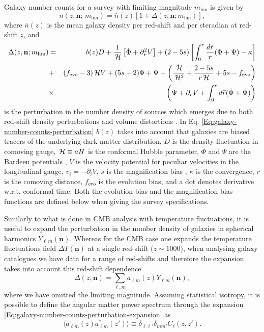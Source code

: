 Galaxy number counts for a survey with limiting magnitude $m_{\mathrm{lim}}$ is given by 
\begin{equation}
\label{Eq:galaxy-number-counts}
n(z,\mathbf{n};\,m_{\mathrm{lim}}) = \bar{n}(z) \left[ 1 + \Delta(z,\mathbf{n};m_{\mathrm{lim}}) \right],
\end{equation}  
where $\bar{n}(z)$ is the mean galaxy density per red-shift and per steradian at red-shift $z$, and 
\begin{eqnarray}
\label{Eq:galaxy-number-counts-perturbation}
\Delta(z,\mathbf{n};m_{\mathrm{lim}}) &=&  b(z) D + \frac{1}{\,{\mathcal H}}\left[ \dot{\Phi} + \partial_r^2 V \right] + (2 - 5 s) \left[ \int_0^r \frac{d\tilde{r}}{r}(\Phi + \Psi) - \kappa \right] \nonumber \\
&+&  (f_{\mathrm{evo}} - 3)\,{\mathcal H} V + (5s-2)\Phi + \Psi 
+ \left( \frac{\dot{\,{\mathcal H}}}{\,{\mathcal H}^2} + \frac{2 - 5s}{r\,{\mathcal H}} + 5s - f_{\mathrm{evo}} \right) \nonumber \\
&\times & \left( \Psi + \partial_rV + \int_0^r d\tilde{r}(\dot{\Phi} + \dot{\Psi}) \right) 
\end{eqnarray}
is the perturbation in the number density of sources which emerges due to both red-shift density perturbations and volume distortions  . In Eq. \eqref{Eq:galaxy-number-counts-perturbation} $b(z)$ takes into account that galaxies are biased tracers of the underlying dark matter distribution, $D$ is the density fluctuation in comoving gauge, $\,{\mathcal H} \equiv aH$ is the conformal Hubble parameter, $\Phi$ and $\Psi$ are the Bardeen potentials , $V$ is the velocity potential for peculiar velocities in the longitudinal gauge, $v_i=-\partial_i V$, $s$ is the magnification bias , $\kappa$ is the convergence, $r$ is the comoving distance, $f_{\mathrm{evo}}$ is the evolution bias, and a dot denotes derivative w.r.t. conformal time. Both the evolution bias and the magnification bias functions are defined below when giving the survey specifications. 

Similarly to what is done in CMB analysis with temperature fluctuations, it is useful to expand the perturbation in the number density of galaxies in spherical harmonics $Y_{\ell\,m}(\mathbf{n})$. Whereas for the CMB case one expands the temperature fluctuations field $\Delta T(\mathbf{n})$ at a single red-shift ($z\sim 1000$), when analysing galaxy catalogues we have data for a range of red-shifts and therefore the expansion takes into account this red-shift dependence
\begin{equation}
\label{Eq:galaxy-number-counts-perturbation-expansion}
\Delta(z,\mathbf{n}) = \sum_{\ell,m} a_{\ell m}(z) Y_{\ell m}(\mathbf{n}), 
\end{equation}   
where we have omitted the limiting magnitude. Assuming statistical isotropy, it is possible to define the angular matter power spectrum through the expansion \eqref{Eq:galaxy-number-counts-perturbation-expansion} as
\begin{equation}
\label{Eq:definition-angular-matter-power-spectrum}
\langle a_{\ell m}(z) a^*_{\ell m}(z') \rangle \equiv \delta_{\ell \ell'} \delta_{m m'} C_\ell(z,z').
\end{equation} 

